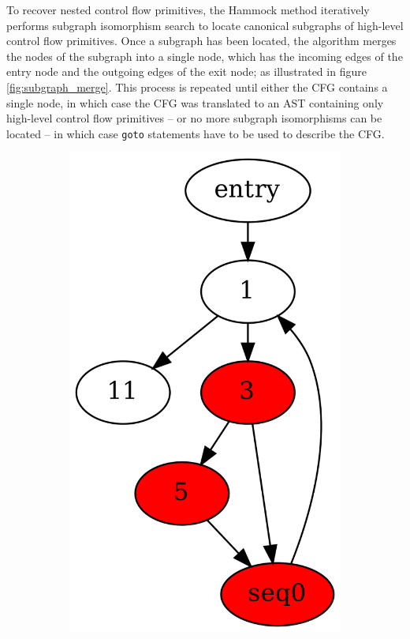 
To recover nested control flow primitives, the Hammock method iteratively performs subgraph isomorphism search to locate canonical subgraphs of high-level control flow primitives. Once a subgraph has been located, the algorithm merges the nodes of the subgraph into a single node, which has the incoming edges of the entry node and the outgoing edges of the exit node; as illustrated in figure \ref{fig:subgraph_merge}. This process is repeated until either the CFG contains a single node, in which case the CFG was translated to an AST containing only high-level control flow primitives -- or no more subgraph isomorphisms can be located -- in which case \texttt{goto} statements have to be used to describe the CFG.

\begin{figure}[htbp]
	\centering
	\begin{subfigure}[ht]{0.17\textwidth}
		\includegraphics[width=\textwidth]{inc/3_background/hammock_method/cfg_pre_merge.png}

\end{subfigure}
\end{figure}
